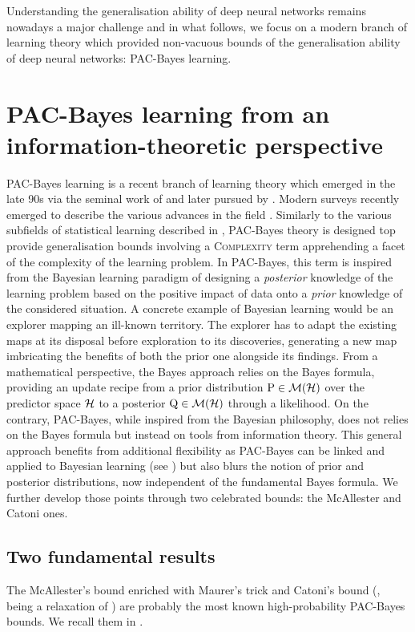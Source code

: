 Understanding the generalisation ability of deep neural networks remains nowadays a major challenge and in what follows, we focus on a modern branch of learning theory which provided non-vacuous bounds of the generalisation ability of deep neural networks: PAC-Bayes learning.

\section{PAC-Bayes learning from an information-theoretic perspective}

PAC-Bayes learning is a recent branch of learning theory which emerged in the late 90s via the seminal work of \citep{shawe1997pac,mcallester1998some,mcallester1999pac,mcallester2003pac} and later pursued by \citep{catoni2003pac,catoni2007pac}. Modern surveys recently emerged to describe the various advances in the field \citep{guedj2019primer,hellstrom2023generalization,alquier2024user}.  Similarly to the various subfields of statistical learning described in , PAC-Bayes theory is designed top provide generalisation bounds involving a \textsc{Complexity} term apprehending a facet of the complexity of the learning problem. In PAC-Bayes, this term is inspired from the Bayesian learning paradigm of designing a \emph{posterior} knowledge of the learning problem based on the positive impact of data onto a \emph{prior} knowledge of the considered situation. A concrete example of Bayesian learning would be an explorer mapping an ill-known territory. The explorer has to adapt the existing maps at its disposal before exploration to its discoveries, generating a new map imbricating the benefits of both the prior one alongside its findings. From a mathematical perspective, the Bayes approach relies on the Bayes formula, providing an update recipe from a prior distribution $\mathrm{P}\in\mathcal{M}(\mathcal{H})$ over the predictor space $\mathcal{H}$ to a posterior $\mathrm{Q}\in\mathcal{M}(\mathcal{H})$ through a likelihood. On the contrary, PAC-Bayes, while inspired from the Bayesian philosophy, does not relies on the Bayes formula but instead on tools from information theory. This general approach benefits from additional flexibility as PAC-Bayes can be linked and applied to Bayesian learning (see \citealp{guedj2019primer}) but also blurs the notion of prior and posterior distributions, now independent of the fundamental Bayes formula. We further develop those points through two celebrated bounds: the McAllester and Catoni ones. 

\subsection*{Two fundamental results}
    The McAllester's bound \citep{mcallester2003pac} enriched with Maurer's trick \citep{maurer2004note} and Catoni's bound (\citealp[Theorem 4.1]{alquier2016properties}, being a relaxation of \citealp[Theorem 1.2.6]{catoni2007pac}) are probably the most known high-probability PAC-Bayes bounds. We recall them in .

